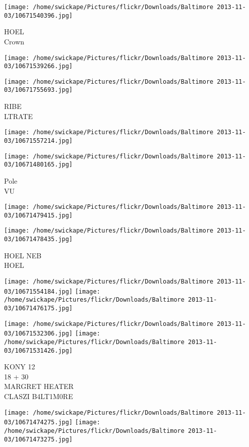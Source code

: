 \documentclass[10pt,letterpaper]{article}
\begin{document}
\vspace{0.25in}
\texttt{[image: /home/swickape/Pictures/flickr/Downloads/Baltimore 2013-11-03/10671540396.jpg]}

HOEL\\
Crown
\pagebreak

\texttt{[image: /home/swickape/Pictures/flickr/Downloads/Baltimore 2013-11-03/10671539266.jpg]}

\vspace{0.25in}
\texttt{[image: /home/swickape/Pictures/flickr/Downloads/Baltimore 2013-11-03/10671755693.jpg]}

RIBE\\
LTRATE
\pagebreak

\texttt{[image: /home/swickape/Pictures/flickr/Downloads/Baltimore 2013-11-03/10671557214.jpg]}

\vspace{0.25in}
\texttt{[image: /home/swickape/Pictures/flickr/Downloads/Baltimore 2013-11-03/10671480165.jpg]}

Pole\\
VU
\pagebreak

\texttt{[image: /home/swickape/Pictures/flickr/Downloads/Baltimore 2013-11-03/10671479415.jpg]}

\vspace{0.25in}
\texttt{[image: /home/swickape/Pictures/flickr/Downloads/Baltimore 2013-11-03/10671478435.jpg]}

HOEL NEB\\
HOEL
\pagebreak

\texttt{[image: /home/swickape/Pictures/flickr/Downloads/Baltimore 2013-11-03/10671554184.jpg]}
\texttt{[image: /home/swickape/Pictures/flickr/Downloads/Baltimore 2013-11-03/10671476175.jpg]}

\texttt{[image: /home/swickape/Pictures/flickr/Downloads/Baltimore 2013-11-03/10671532306.jpg]}
\texttt{[image: /home/swickape/Pictures/flickr/Downloads/Baltimore 2013-11-03/10671531426.jpg]}

KONY 12\\
18 + 30\\
MARGRET HEATER\\
CLASZI B4LT1M0RE
\pagebreak

\texttt{[image: /home/swickape/Pictures/flickr/Downloads/Baltimore 2013-11-03/10671474275.jpg]}
\texttt{[image: /home/swickape/Pictures/flickr/Downloads/Baltimore 2013-11-03/10671473275.jpg]}
\end{document}
